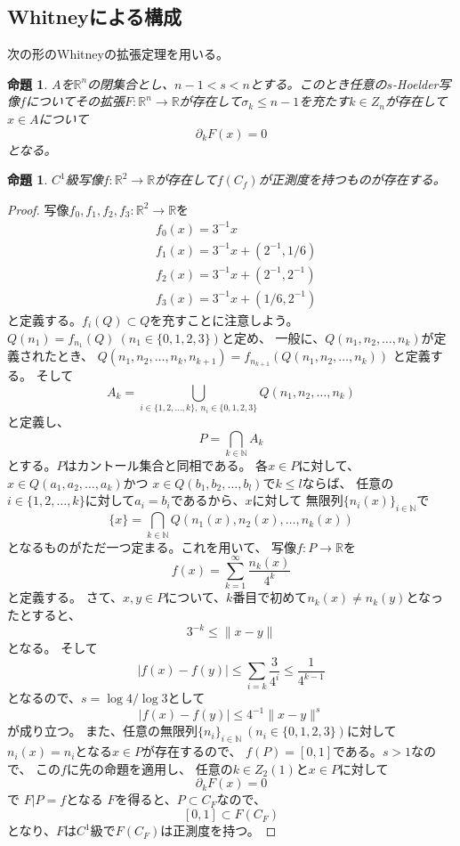 \documentclass[leqno]{jsarticle}
\newtheorem{prop}[thm]{命題}
\newcommand{\nn}{\mathbb{N}}
\newcommand{\rr}{\mathbb{R}}
\begin{document}
\subsection{Whitneyによる構成}
次の形のWhitneyの拡張定理を用いる。
\begin{prop}
$A$を$\rr^n$の閉集合とし、$n-1<s<n$とする。このとき任意の$s$-Hoelder写像$f$についてその拡張$F:\rr^n\to \rr$が存在して$\sigma_k\le n-1$を充たす$k\in Z_n$が存在して$x\in A$について
\[
\partial_kF(x)=0
\]
となる。
\end{prop}
\begin{prop}\label{whitney}
$C^1$級写像$f:\rr^2\to \rr$が存在して$f(C_f)$が正測度を持つものが存在する。
\end{prop}
\begin{proof}
写像$f_0,f_1,f_2,f_3:\rr^2\to \rr$を
\begin{align*}
&f_0(x)=3^{-1}x\\
&f_1(x)=3^{-1}x+(2^{-1}, 1/6)\\
&f_2(x)=3^{-1}x+(2^{-1}, 2^{-1})\\
&f_3(x)=3^{-1}x+(1/6, 2^{-1})
\end{align*}
と定義する。$f_i(Q)\subset Q$を充すことに注意しよう。
$Q(n_1)=f_{n_1}(Q)\ (n_1\in \{0,1,2,3\})$と定め、
一般に、$Q(n_1, n_2,\dots, n_{k})$が定義されたとき、
$Q(n_1, n_2,\dots, n_k,n_{k+1})=f_{n_{k+1}}(Q(n_1, n_2,\dots, n_k))$
と定義する。
そして
\[
A_k=\bigcup_{i\in \{1,2,\dots, k\},\ n_i\in \{0,1,2,3\}}Q(n_1, n_2,\dots, n_k)
\]
と定義し、
\[
P=\bigcap_{k\in \nn} A_k
\]
とする。$P$はカントール集合と同相である。
各$x\in P$に対して、$x\in Q(a_1, a_2,\dots, a_k)$かつ
$x\in Q(b_1, b_2,\dots, b_l)$で$k\le l$ならば、
任意の$i\in \{1,2,\dots, k\}$に対して$a_i=b_i$であるから、$x$に対して
無限列$\{n_i(x)\}_{i\in \nn}$で
\[
\{x\}=\bigcap_{k\in \nn}Q(n_1(x), n_2(x),\dots, n_k(x))
\]
となるものがただ一つ定まる。これを用いて、
写像$f:P\to \rr$を
\[
f(x)=\sum_{k=1}^{\infty}\frac{n_k(x)}{4^k}
\]
と定義する。
さて、$x,y\in P$について、$k$番目で初めて$n_k(x)\neq n_k(y)$となったとすると、
\[
3^{-k}\le \|x-y\|
\]
となる。
そして
\[
|f(x)-f(y)|\le \sum_{i=k}\frac{3}{4^i}\le \frac{1}{4^{k-1}}
\]
となるので、$s=\log 4/\log 3$として
\[
|f(x)-f(y)|\le 4^{-1} \|x-y\|^{s}
\]
が成り立つ。
また、任意の無限列$\{n_i\}_{i\in \nn}\ (n_i\in \{0,1,2,3\})$に対して
$n_i(x)=n_i$となる$x\in P$が存在するので、
$f(P)=[0,1]$である。$s>1$なので、
この$f$に先の命題を適用し、
任意の$k\in Z_2(1)$と$x\in P$に対して
\[
\partial_kF(x)=0
\]
で
$F|P=f$となる
$F$を得ると、$P\subset C_F$なので、
\[
[0,1]\subset F(C_F)
\]
となり、$F$は$C^1$級で$F(C_F)$は正測度を持つ。
\end{proof}
\end{document}
